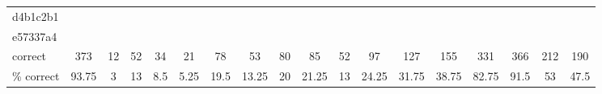 \begin{table*}[htb]
\begin{tabular}{l|ccccccccccccccccc}
d4b1c2b1  & \C & \X & \C & \X & \X & \X & \X & \C & \C & \C & \C & \C & \C & \C & \C & \X & \X\\
e57337a4  & \C & \X & \C & \X & \X & \X & \X & \C & \C & \C & \C & \C & \C & \C & \C & \C & \C\\
\midrule
correct & 
373 & 12 & 52 & 34 & 21 & 78 & 53 & 80 & 85 & 52 & 97 & 127 & 155 & 331 & 366 & 212 & 190\\ 
\% correct & 
93.75 & 3 & 13 & 8.5 & 5.25 & 19.5 & 13.25 & 20 & 21.25 & 13 & 24.25 & 31.75 & 38.75 & 82.75 & 91.5 & 53 & 47.5 \\
\bottomrule
\end{tabular}
\label{tab:arc400eval4}
\end{table*}

